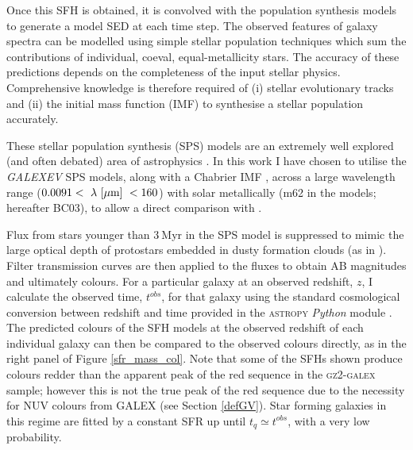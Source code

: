 Once this SFH is obtained, it is convolved with the \citet{BC03} population synthesis models to generate a model SED at each time step. The observed features of galaxy spectra can be modelled using simple stellar population techniques which sum the contributions of individual, coeval, equal-metallicity stars. The accuracy of these predictions depends on the completeness of the input stellar physics. Comprehensive knowledge is therefore required of (i) stellar evolutionary tracks and (ii) the initial mass function (IMF) to synthesise a stellar population accurately. 

These stellar population synthesis (SPS) models are an extremely well explored (and often debated) area of astrophysics \citep{Maraston05, Eminian08, CGW09, falkenberg09, chen10, kriek10, miner11, melbourne12}. In this work I have chosen to utilise the \citet{BC03} \emph{GALEXEV} SPS models, along with a Chabrier IMF \citep{chabrier03}, across a large wavelength range ($0.0091 < ~\lambda~\rm{[\mu m]}~ < 160 $) with solar metallically (m62 in the \citet{BC03} models; hereafter BC03), to allow a direct comparison with \citet{schawinski14}.


Flux from stars younger than $3~$Myr in the SPS model is suppressed to mimic the large optical depth of protostars embedded in dusty formation clouds (as in \citealt{schawinski14}).  Filter transmission curves are then applied to the fluxes to obtain AB magnitudes and ultimately colours.  For a particular galaxy at an observed redshift, $z$, I calculate the observed time, $t^{obs}$, for that galaxy using the standard cosmological conversion between redshift and time provided in the \textsc{astropy} {\em Python} module \citep{astropy13}. The predicted colours of the SFH models at the observed redshift of each individual galaxy can then be compared to the observed colours directly, as in the right panel of Figure \ref{sfr_mass_col}. Note that some of the SFHs shown produce colours redder than the apparent peak of the red sequence in the \textsc{gz2-galex} sample; however this is not the true peak of the red sequence due to the necessity for NUV colours from GALEX (see Section \ref{defGV}). Star forming galaxies in this regime are fitted by a constant SFR up until $t_q \simeq t^{obs}$, with a very low probability.

